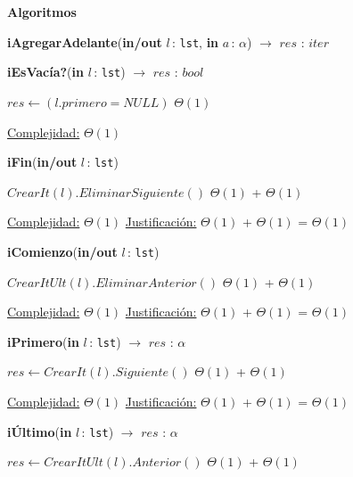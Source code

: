 \documentclass[a4paper,10pt]{article}
\let\TipoVariable=\texttt
\let\ModificadorArgumento=\textbf
\newcommand{\In}[2]{\ModificadorArgumento{in} \ensuremath{#1}\,: \TipoVariable{#2}\xspace}
\newcommand{\Inout}[2]{\ModificadorArgumento{in/out} \ensuremath{#1}\,: \TipoVariable{#2}\xspace}
\newenvironment{Algoritmos}{%
  \vspace*{2ex}%
  \noindent\textbf{\Large Algoritmos}%
  \vspace*{2ex}%
}{}
\begin{document}
\begin{Algoritmos}
\begin{







ithm}[H]{\textbf{iAgregarAdelante}(\Inout{l}{lst}, \In{a}{$\alpha$}) $\to$ $res$ : $iter$}
\begin{algorithm}[H]{\textbf{iEsVacía?}(\In{l}{lst}) $\to$ $res$ : $bool$}
	\begin{algorithmic}[1]
			 \State $res \gets (l.primero = NULL)$	 \Comment $\Theta(1)$
    
			\medskip
			\Statex \underline{Complejidad:} $\Theta(1)$
    	\end{algorithmic}
\end{algorithm}	


\begin{algorithm}[H]{\textbf{iFin}(\Inout{l}{lst})}
	\begin{algorithmic}[1]
			 \State $CrearIt(l).EliminarSiguiente()$	\Comment $\Theta(1)$ + $\Theta(1)$
			 
			\medskip
			\Statex \underline{Complejidad:} $\Theta(1)$
			\Statex \underline{Justificación:} $\Theta(1)$ + $\Theta(1)$ = $\Theta(1)$
    	\end{algorithmic}
\end{algorithm}	

	
\begin{algorithm}[H]{\textbf{iComienzo}(\Inout{l}{lst})}	
	\begin{algorithmic}[1]
			 \State $CrearItUlt(l).EliminarAnterior()$	\Comment $\Theta(1)$ + $\Theta(1)$
    	    
			\medskip
			\Statex \underline{Complejidad:} $\Theta(1)$
			\Statex \underline{Justificación:} $\Theta(1)$ + $\Theta(1)$ = $\Theta(1)$
			 
    	\end{algorithmic}
\end{algorithm}	
	
\begin{algorithm}[H]{\textbf{iPrimero}(\In{l}{lst}) $\to$ $res$ : $\alpha$}	
	\begin{algorithmic}[1]
		 \State $res \gets CrearIt(l).Siguiente()$	\Comment $\Theta(1)$ + $\Theta(1)$

		\medskip
		\Statex \underline{Complejidad:} $\Theta(1)$
		\Statex \underline{Justificación:} $\Theta(1)$ + $\Theta(1)$ = $\Theta(1)$
    \end{algorithmic}
\end{algorithm}	
	
\begin{algorithm}[H]{\textbf{iÚltimo}(\In{l}{lst}) $\to$ $res$ : $\alpha$}	
	\begin{algorithmic}[1]
			 \State $res \gets CrearItUlt(l).Anterior()$	\Comment $\Theta(1)$ + $\Theta(1)$
    	    	    

\end{algorithmic}
\end{algorithm}
\end{







ithm}
\end{Algoritmos}
\end{document}
